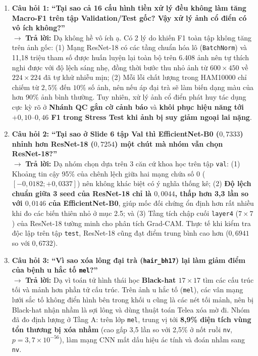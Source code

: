 \documentclass[11pt,a4paper]{article}
\begin{document}
\begin{enumerate}
    \item \textbf{Câu hỏi 1: ``Tại sao cả 16 cấu hình tiền xử lý đều không làm tăng Macro-F1 trên tập Validation/Test gốc? Vậy xử lý ảnh cổ điển có vô ích không?''}\\
    $\rightarrow$ \textbf{Trả lời:} Dạ không hề vô ích ạ. Có 2 lý do khiến F1 toàn tập không tăng trên ảnh gốc: (1) Mạng ResNet-18 có các tầng chuẩn hóa lô (\texttt{BatchNorm}) và 11,18 triệu tham số được huấn luyện lại toàn bộ trên 6.408 ảnh nên tự thích nghi được với độ lệch sáng nhẹ, đồng thời bước thu nhỏ ảnh từ $600\times 450$ về $224\times 224$ đã tự khử nhiễu mịn; (2) Mỗi lỗi chất lượng trong HAM10000 chỉ chiếm từ $2{,}5\%$ đến $10\%$ số ảnh, nên nếu áp đại trà sẽ làm biến dạng màu của hơn $90\%$ ảnh bình thường. Tuy nhiên, xử lý ảnh cổ điển phát huy tác dụng cực kỳ rõ ở \textbf{Nhánh QC gắn cờ cảnh báo} và \textbf{khôi phục hiệu năng tới $+0{,}10\text{--}0{,}46$ F1 trong Stress Test khi ảnh bị suy giảm ngoại lai nặng}.

    \item \textbf{Câu hỏi 2: ``Tại sao ở Slide 6 tập Val thì EfficientNet-B0 ($0{,}7333$) nhỉnh hơn ResNet-18 ($0{,}7254$) một chút mà nhóm vẫn chọn ResNet-18?''}\\
    $\rightarrow$ \textbf{Trả lời:} Dạ nhóm chọn dựa trên 3 căn cứ khoa học trên tập \texttt{val}: (1) Khoảng tin cậy 95\% của chênh lệch giữa hai mạng chứa số 0 ($[-0{,}0182; +0{,}0337]$) nên không khác biệt có ý nghĩa thống kê; (2) \textbf{Độ lệch chuẩn giữa 3 seed của ResNet-18 chỉ là $0{,}0044$, thấp hơn 3,3 lần so với $0{,}0146$ của EfficientNet-B0}, giúp mốc đối chứng ổn định hơn rất nhiều khi đo các biến thiên nhỏ ở mục 2.5; và (3) Tầng tích chập cuối \texttt{layer4} ($7\times 7$) của ResNet-18 tường minh cho phân tích Grad-CAM. Thực tế khi kiểm tra độc lập trên tập \texttt{test}, ResNet-18 cũng đạt điểm trung bình cao hơn ($0{,}6941$ so với $0{,}6732$).

    \item \textbf{Câu hỏi 3: ``Vì sao xóa lông đại trà (\texttt{hair\_bh17}) lại làm giảm điểm của bệnh u hắc tố \texttt{mel}?''}\\
    $\rightarrow$ \textbf{Trả lời:} Dạ vì toán tử hình thái học \textbf{Black-hat $17\times 17$} tìm các cấu trúc tối và mảnh hơn phần tử cấu trúc. Trên ảnh u hắc tố (\texttt{mel}), các vân mạng lưới sắc tố không điển hình bên trong khối u cũng là các nét tối mảnh, nên bị Black-hat nhận nhầm là sợi lông và dùng thuật toán Telea xóa mờ đi. Nhóm đã đo định lượng ở Tầng A: trên lớp \texttt{mel}, trung vị tới \textbf{8,9\% diện tích vùng tổn thương bị xóa nhầm} (cao gấp 3,5 lần so với 2,5\% ở nốt ruồi \texttt{nv}, $p = 3{,}7\times 10^{-56}$), làm mạng CNN mất dấu hiệu ác tính và đoán nhầm sang \texttt{nv}.


\end{enumerate}
\end{document}
